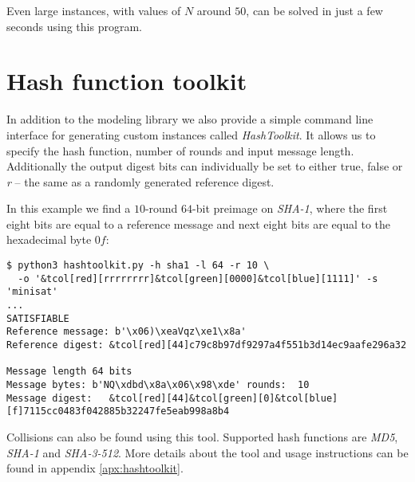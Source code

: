 Even large instances, with values of $N$ around $50$, can be solved in just a few seconds using this program.

\section{Hash function toolkit}
In addition to the modeling library we also provide a simple command line interface for generating custom instances called \emph{HashToolkit}.
It allows us to specify the hash function, number of rounds and input message length.
Additionally the output digest bits can individually be set to either true, false or \emph{r} -- the same as a randomly generated reference digest.

In this example we find a $10$-round $64$-bit preimage on \emph{SHA-1}, where the first eight bits are equal to a reference message and next eight bits are equal to the hexadecimal byte $0f$:

\newcommand*{\tcol}[2]{\textcolor{#1}{#2}}
\begin{Verbatim}[commandchars=&\[\]]
$ python3 hashtoolkit.py -h sha1 -l 64 -r 10 \
  -o '&tcol[red][rrrrrrrr]&tcol[green][0000]&tcol[blue][1111]' -s 'minisat'
...
SATISFIABLE
Reference message: b'\x06)\xeaVqz\xe1\x8a'
Reference digest: &tcol[red][44]c79c8b97df9297a4f551b3d14ec9aafe296a32

Message length 64 bits
Message bytes: b'NQ\xdbd\x8a\x06\x98\xde' rounds:  10
Message digest:   &tcol[red][44]&tcol[green][0]&tcol[blue][f]7115cc0483f042885b32247fe5eab998a8b4
\end{Verbatim}

Collisions can also be found using this tool.
Supported hash functions are \emph{MD5}, \emph{SHA-1} and \emph{SHA-3-512}.
More details about the tool and usage instructions can be found in appendix \ref{apx:hashtoolkit}.

